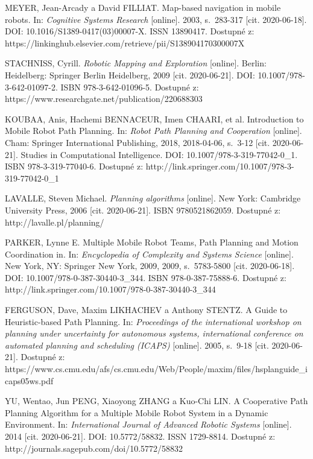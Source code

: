 \cleardoublepage
{}
{}
\begin{thebibliography}{99}

MEYER, Jean-Arcady a David FILLIAT. Map-based navigation in mobile robots. In: \textit{Cognitive Systems Research} [online]. 2003, s.~283-317 [cit. 2020-06-18]. DOI: 10.1016/S1389-0417(03)00007-X. ISSN 13890417. Dostupné z: https://linkinghub.elsevier.com/retrieve/pii/S138904170300007X

STACHNISS, Cyrill. \textit{Robotic Mapping and Exploration} [online]. Berlin: Heidelberg: Springer Berlin Heidelberg, 2009 [cit. 2020-06-21]. DOI: 10.1007/978-3-642-01097-2. ISBN 978-3-642-01096-5. Dostupné z: https://www.researchgate.net/publication/220688303

KOUBAA, Anis, Hachemi BENNACEUR, Imen CHAARI, et al. Introduction to Mobile Robot Path Planning. In: \textit{Robot Path Planning and Cooperation} [online]. Cham: Springer International Publishing, 2018, 2018-04-06, s.~3-12 [cit. 2020-06-21]. Studies in Computational Intelligence. DOI: 10.1007/978-3-319-77042-0\_1. ISBN 978-3-319-77040-6. Dostupné z: http://link.springer.com/10.1007/978-3-319-77042-0\_1

LAVALLE, Steven Michael. \textit{Planning algorithms} [online]. New York: Cambridge University Press, 2006 [cit. 2020-06-21]. ISBN 9780521862059. Dostupné z: http://lavalle.pl/planning/

PARKER, Lynne E. Multiple Mobile Robot Teams, Path Planning and Motion Coordination in. In: \textit{Encyclopedia of Complexity and Systems Science} [online]. New York, NY: Springer New York, 2009, 2009, s.~5783-5800 [cit. 2020-06-18]. DOI: 10.1007/978-0-387-30440-3\_344. ISBN 978-0-387-75888-6. Dostupné z: http://link.springer.com/10.1007/978-0-387-30440-3\_344

FERGUSON, Dave, Maxim LIKHACHEV a Anthony STENTZ. A Guide to Heuristic-based Path Planning. In: \textit{Proceedings of the international workshop on planning under uncertainty for autonomous systems, international conference on automated planning and scheduling (ICAPS)} [online]. 2005, s.~9-18 [cit. 2020-06-21]. Dostupné z: https://www.cs.cmu.edu/afs/cs.cmu.edu/Web/People/maxim/files/hsplanguide\_icaps05ws.pdf

YU, Wentao, Jun PENG, Xiaoyong ZHANG a Kuo-Chi LIN. A Cooperative Path Planning Algorithm for a Multiple Mobile Robot System in a Dynamic Environment. In: \textit{International Journal of Advanced Robotic Systems} [online]. 2014 [cit. 2020-06-21]. DOI: 10.5772/58832. ISSN 1729-8814. Dostupné z: http://journals.sagepub.com/doi/10.5772/58832


\end{thebibliography}
